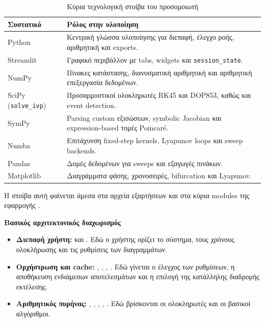 \begin{table}[H]
\centering
\caption{Κύρια τεχνολογική στοίβα του προσομοιωτή}
\label{tab:ch2-stack}
\renewcommand{\arraystretch}{1.15}
\begin{tabular}{|l|p{}|}
\hline
\textbf{Συστατικό} & \textbf{Ρόλος στην υλοποίηση} \\
\hline
Python & Κεντρική γλώσσα υλοποίησης για διεπαφή, έλεγχο ροής, αριθμητική και exports. \\
\hline
Streamlit & Γραφικό περιβάλλον με tabs, widgets και \texttt{session\_state}. \\
\hline
NumPy & Πίνακες κατάστασης, διανυσματική αριθμητική και αριθμητική επεξεργασία δεδομένων. \\
\hline
SciPy (\texttt{solve\_ivp}) & Προσαρμοστικοί ολοκληρωτές RK45 και DOP853, καθώς και event detection. \\
\hline
SymPy & Parsing custom εξισώσεων, symbolic Jacobian και expression-based τομές Poincar\'e. \\
\hline
Numba & Επιτάχυνση fixed-step kernels, Lyapunov loops και sweep backends. \\
\hline
Pandas & Δομές δεδομένων για sweeps και εξαγωγές πινάκων. \\
\hline
Matplotlib & Διαγράμματα φάσης, χρονοσειρές, bifurcation και Lyapunov. \\
\hline
\end{tabular}
\end{table}

Η στοίβα αυτή φαίνεται άμεσα στα αρχεία εξαρτήσεων και στα κύρια modules της
εφαρμογής \cite{nlds_src_app_requirements,nlds_src_app_main}.

\begin{importantbox}
\textbf{Βασικός αρχιτεκτονικός διαχωρισμός}

\begin{itemize}
\item \textbf{Διεπαφή χρήστη:}  και
. Εδώ ο χρήστης ορίζει το σύστημα, τους
χρόνους ολοκλήρωσης και τις ρυθμίσεις των διαγραμμάτων.
\item \textbf{Ορχήστρωση και cache:} ,
, , .
Εδώ γίνεται ο έλεγχος των ρυθμίσεων, η αποθήκευση ενδιάμεσων αποτελεσμάτων και
η επιλογή της κατάλληλης διαδρομής εκτέλεσης.
\item \textbf{Αριθμητικός πυρήνας:} ,
, ,
, . Εδώ βρίσκονται οι
ολοκληρωτές και οι βασικοί αλγόριθμοι.
\end{itemize}
\end{importantbox}


